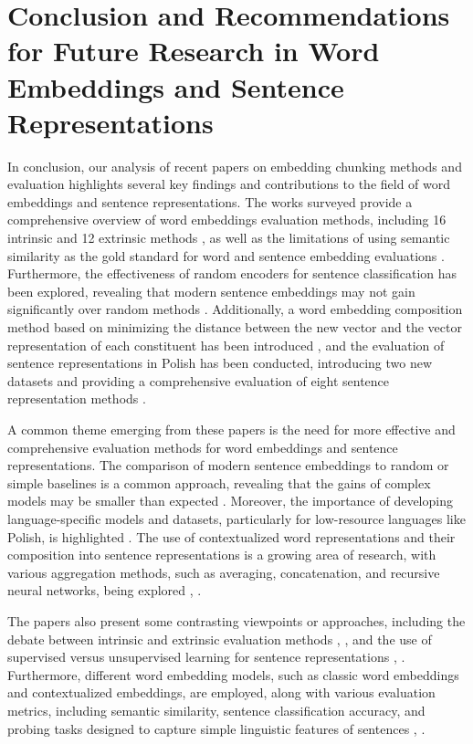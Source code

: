 \documentclass[conference]{IEEEtran}
\begin{document}
\section{Conclusion and Recommendations for Future Research in Word Embeddings and Sentence Representations}
In conclusion, our analysis of recent papers on embedding chunking methods and evaluation highlights several key findings and contributions to the field of word embeddings and sentence representations. The works surveyed provide a comprehensive overview of word embeddings evaluation methods, including 16 intrinsic and 12 extrinsic methods \cite{b1}, as well as the limitations of using semantic similarity as the gold standard for word and sentence embedding evaluations \cite{b2}. Furthermore, the effectiveness of random encoders for sentence classification has been explored, revealing that modern sentence embeddings may not gain significantly over random methods \cite{b3}. Additionally, a word embedding composition method based on minimizing the distance between the new vector and the vector representation of each constituent has been introduced \cite{b4}, and the evaluation of sentence representations in Polish has been conducted, introducing two new datasets and providing a comprehensive evaluation of eight sentence representation methods \cite{b5}.

A common theme emerging from these papers is the need for more effective and comprehensive evaluation methods for word embeddings and sentence representations. The comparison of modern sentence embeddings to random or simple baselines is a common approach, revealing that the gains of complex models may be smaller than expected \cite{b3}. Moreover, the importance of developing language-specific models and datasets, particularly for low-resource languages like Polish, is highlighted \cite{b5}. The use of contextualized word representations and their composition into sentence representations is a growing area of research, with various aggregation methods, such as averaging, concatenation, and recursive neural networks, being explored \cite{b1}, \cite{b4}.

The papers also present some contrasting viewpoints or approaches, including the debate between intrinsic and extrinsic evaluation methods \cite{b1}, \cite{b2}, and the use of supervised versus unsupervised learning for sentence representations \cite{b3}, \cite{b5}. Furthermore, different word embedding models, such as classic word embeddings and contextualized embeddings, are employed, along with various evaluation metrics, including semantic similarity, sentence classification accuracy, and probing tasks designed to capture simple linguistic features of sentences \cite{b1}, \cite{b4}.
\end{document}
